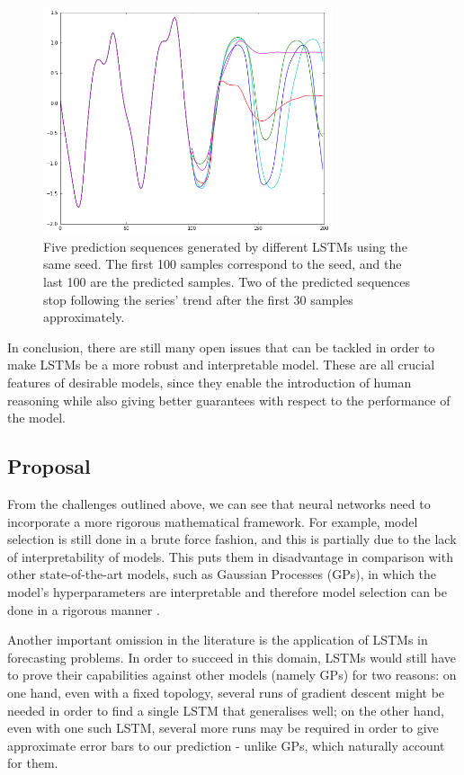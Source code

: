 \documentclass[pdftex,12pt,a4paper]{article}
\theoremstyle{definition}
\theoremstyle{remark}
\begin{document}
\begin{figure}[t]
    \centering
    \includegraphics[width=8.5cm]{figs/decay.png}
    \caption{Five prediction sequences generated by different LSTMs using the same seed. The first 100 samples correspond to the seed, and the last 100 are the predicted samples. Two of the predicted sequences stop following the series' trend after the first 30 samples approximately.}
    \label{fig:decay} 
\end{figure} 

\par In conclusion, there are still many open issues that can be tackled in order to make LSTMs be a more robust and interpretable model. These are all crucial features of desirable models, since they enable the introduction of human reasoning while also giving better guarantees with respect to the performance of the model. 

\subsection{Proposal}
From the challenges outlined above, we can see that neural networks need to incorporate a more rigorous mathematical framework. For example, model selection is still done in a brute force fashion, and this is partially due to the lack of interpretability of models. This puts them in disadvantage in comparison with other state-of-the-art models, such as Gaussian Processes (GPs), in which the model's hyperparameters are interpretable and therefore model selection can be done in a rigorous manner \cite{Rasmussen2006}.

\par Another important omission in the literature is the application of LSTMs in forecasting problems. In order to succeed in this domain, LSTMs would still have to prove their capabilities against other models (namely GPs) for two reasons: on one hand, even with a fixed topology, several runs of gradient descent might be needed in order to find a single LSTM that generalises well; on the other hand, even with one such LSTM, several more runs may be required in order to give approximate error bars to our prediction - unlike GPs, which naturally account for them.
\end{document}
